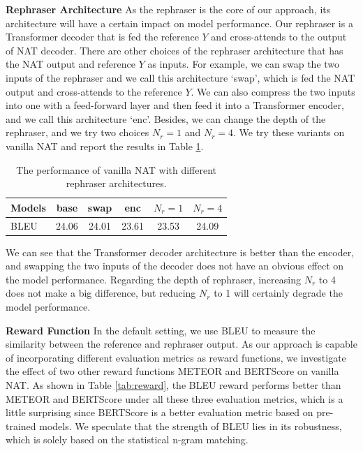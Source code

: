 \documentclass[letterpaper]{article} %
\begin{document}
\vspace{5pt}
\noindent{}\textbf{Rephraser Architecture} As the rephraser is the core of our approach, its architecture will have a certain impact on model performance. Our rephraser is a Transformer decoder that is fed the reference $Y$ and cross-attends to the output of NAT decoder. There are other choices of the rephraser architecture that has the NAT output and reference $Y$ as inputs. For example, we can swap the two inputs of the rephraser and we call this architecture `swap', which is fed the NAT output and cross-attends to the reference $Y$. We can also compress the two inputs into one with a feed-forward layer and then feed it into a Transformer encoder, and we call this architecture `enc'. Besides, we can change the depth of the rephraser, and we try two choices $N_r=1$ and $N_r=4$. We try these variants on vanilla NAT and report the results in Table \ref{tab:archi}.
\begin{table}[t]
\small
\centering
\begin{tabular}{lccccc}
\toprule
{\textbf{Models}} &base& swap & enc& $N_r=1$&$N_r=4$\\
\midrule
BLEU&24.06&24.01&23.61&23.53&24.09\\
\bottomrule
\end{tabular}
\caption{The performance of vanilla NAT with different rephraser architectures.}
\label{tab:archi}
\end{table}

We can see that the Transformer decoder architecture is better than the encoder, and swapping the two inputs of the decoder does not have an obvious effect on the model performance. Regarding the depth of rephraser, increasing $N_r$ to 4 does not make a big difference, but reducing $N_r$ to 1 will certainly degrade the model performance.

\vspace{5pt}
\noindent{}\textbf{Reward Function} In the default setting, we use BLEU to measure the similarity between the reference and rephraser output. 
As our approach is capable of incorporating different evaluation metrics as reward functions, we investigate the effect of two other reward functions METEOR \cite{banerjee-lavie-2005-meteor} and BERTScore \cite{zhang2019bertscore} on vanilla NAT. As shown in Table \ref{tab:reward}, the BLEU reward performs better than METEOR and BERTScore under all these three evaluation metrics, which is a little surprising since BERTScore is a better evaluation metric based on pre-trained models. We speculate that the strength of BLEU lies in its robustness, which is solely based on the statistical n-gram matching. 
\end{document}
